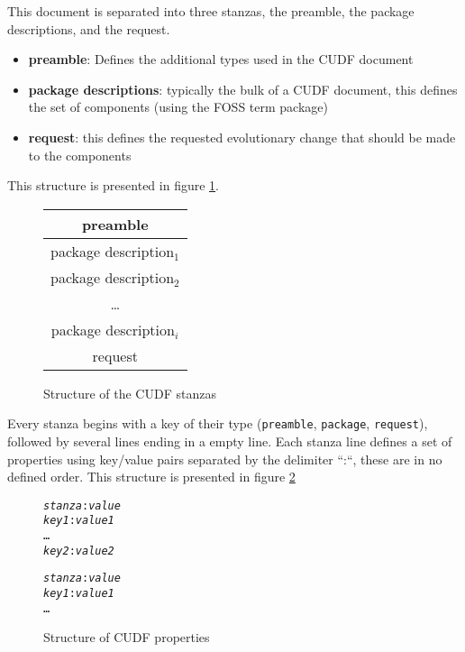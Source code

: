 This document is separated into three stanzas, the preamble, the package descriptions, and the request.

\begin{itemize}
  \item \textbf{preamble}: Defines the additional types used in the CUDF document
  \item \textbf{package descriptions}: typically the bulk of a CUDF document, this defines the set of components (using the FOSS term package)
  \item \textbf{request}: this defines the requested evolutionary change that should be made to the components 
\end{itemize}

This structure is presented in figure \ref{formal:cudfstruct}.

\begin{figure}[htp]
\centering
\begin{tabular}{|c|}
\hline preamble \\ \hline
\hline package description$_{1}$ \\ \hline
\hline package description$_{2}$ \\ \hline
 \multicolumn{1}{c}{\ldots}  \\ 
\hline package description$_{i}$\\ \hline
\hline request\\ \hline
\end{tabular}
\caption{Structure of the CUDF stanzas}
\label{formal:cudfstruct}
\end{figure}

Every stanza begins with a key of their type (\verb+preamble+, \verb+package+, \verb+request+), followed by several lines ending in a empty line.
Each stanza line defines a set of properties using key/value pairs separated by the delimiter ``:``, these are in no defined order.
This structure is presented in figure \ref{formal.cudfproperties}

\begin{figure}[htp] 
\begin{center}
\begin{alltt}
\textit{stanza}: \textit{value}
\textit{key1}: \textit{value1}
\ldots
\textit{key2}: \textit{value2}

\textit{stanza}: \textit{value}
\textit{key1}: \textit{value1}
\ldots
\end{alltt}
  \caption[CUDF property structure]{Structure of CUDF properties}
  \label{formal.cudfproperties}
\end{center}
\end{figure}


